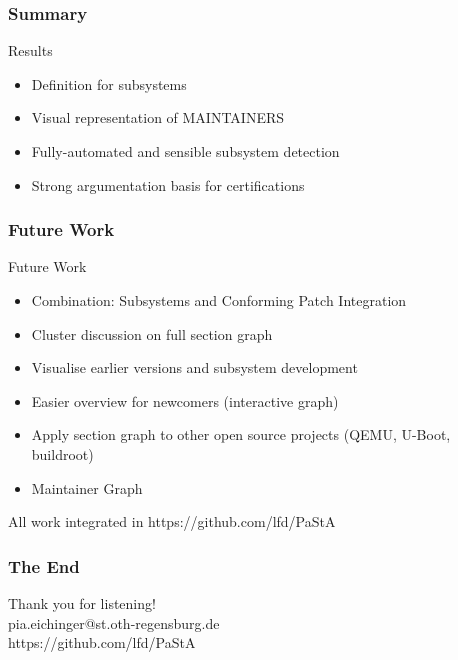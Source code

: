 \documentclass[9pt]{beamer}
\begin{document}
	\begin{frame}
	\frametitle{Summary}
		\begin{block}{Results}
			\begin{itemize}
				\item Definition for subsystems
				\item Visual representation of MAINTAINERS
				\item Fully-automated and sensible subsystem detection
				\item Strong argumentation basis for certifications
			\end{itemize}
		\end{block}
	\end{frame}

	\begin{frame}
	\frametitle{Future Work}
		\begin{block}{Future Work}
			\begin{itemize}
				\item Combination: Subsystems and Conforming Patch Integration
				\item Cluster discussion on full section graph
				\item Visualise earlier versions and subsystem development
				\item Easier overview for newcomers (interactive graph)
				\item Apply section graph to other open source projects (QEMU, U-Boot, buildroot)
				\item Maintainer Graph
			\end{itemize}
		\end{block}

		All work integrated in https://github.com/lfd/PaStA
	\end{frame}


	\begin{frame}
	\frametitle{The End}
	\begin{center}
	\huge Thank you for listening!\\
	\small pia.eichinger@st.oth-regensburg.de\\
	https://github.com/lfd/PaStA
	\end{center}
	\end{frame}
\end{document}
